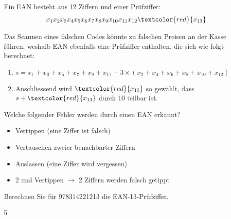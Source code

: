 Ein EAN besteht aus 12 Ziffern und einer Prüfziffer:
\begin{equation}\label{eq:ean}
x_1x_2x_3x_4x_5x_6x_7x_8x_9x_{10}x_{11}x_{12}\textcolor{red}{x_{13}}
\end{equation}


Das Scannen eines falschen Codes könnte zu falschen Preisen an der Kasse führen, weshalb EAN ebenfalls eine Prüfziffer enthalten, die sich wie folgt berechnet:

\begin{enumerate}
\item $s=x_1+x_3+ x_5+ x_7+ x_9+ x_{11}+3\times( x_2+ x_4+ x_6+ x_8+ x_{10}+ x_{12})$
\item Anschliessend wird $\textcolor{red}{x_{13}}$ so gewählt, dass $s+\textcolor{red}{x_{13}}$ durch 10 teilbar ist.
\end{enumerate}


\begin{myexercise}
Welche folgender Fehler werden durch einen EAN erkannt?
\begin{itemize}
\item Vertippen (eine Ziffer ist falsch)
\item Vertauschen zweier benachbarter Ziffern
\item Auslassen (eine Ziffer wird vergessen)
\item 2 mal Vertippen $\rightarrow$ 2 Ziffern werden falsch getippt
\end{itemize}
\end{myexercise}

\begin{myexercise}
Berechnen Sie für 978314221213 die EAN-13-Prüfziffer.
\begin{myanswer}
5
\end{myanswer}
\end{myexercise}

